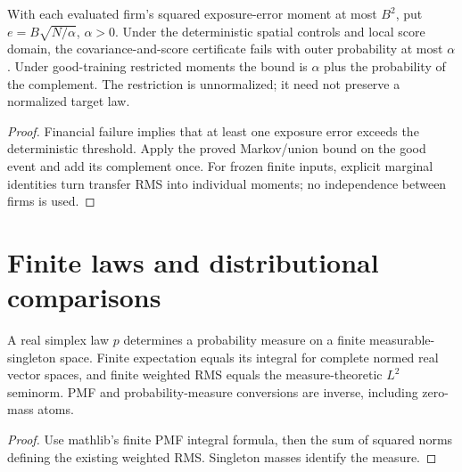 \begin{theorem}\label{thm:statistical-finance}
  \leanok
  With each evaluated firm's squared exposure-error moment at most $B^2$, put
  $e=B\sqrt{N/\alpha}$, $\alpha>0$. Under the deterministic spatial controls
  and local score domain, the covariance-and-score certificate fails with outer
  probability at most $\alpha$. Under good-training restricted moments the bound
  is $\alpha$ plus the probability of the complement. The restriction is
  unnormalized; it need not preserve a normalized target law.
\end{theorem}
\begin{proof}\leanok
  Financial failure implies that at least one exposure error exceeds the
  deterministic threshold. Apply the proved Markov/union bound on the good event
  and add its complement once. For frozen finite inputs, explicit marginal
  identities turn transfer RMS into individual moments; no independence between
  firms is used.
\end{proof}

\section{Finite laws and distributional comparisons}\label{sec:bp-finite-laws}

\begin{theorem}\label{thm:finite-measure-bridge}
  \leanok
  A real simplex law $p$ determines a probability measure on a finite
  measurable-singleton space. Finite expectation equals its integral for
  complete normed real vector spaces, and finite weighted RMS equals the
  measure-theoretic $L^2$ seminorm. PMF and probability-measure conversions are
  inverse, including zero-mass atoms.
\end{theorem}
\begin{proof}\leanok
  Use mathlib's finite PMF integral formula, then the sum of squared norms
  defining the existing weighted RMS. Singleton masses identify the measure.
\end{proof}


